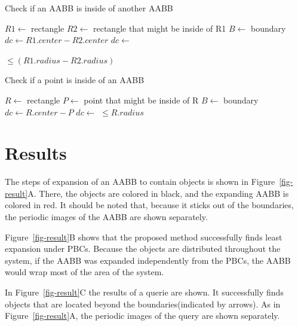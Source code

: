 \documentclass[10pt,letterpaper,twocolumn]{article}
\begin{document}
\begin{algorithm}[tb]
    \caption{Check if an AABB is inside of another AABB}
    \label{aabb_within_aabb}
    \begin{algorithmic}
        \State $R1 \gets$ rectangle
        \State $R2 \gets$ rectangle that might be inside of R1
        \State $B  \gets$ boundary
            \State $dc \gets R1.center - R2.center$
            \State $dc \gets$ 

            \State \Return {} $\leq (R1.radius - R2.radius)$
        \EndFunction
     \end{algorithmic}
\end{algorithm}

\begin{algorithm}[tb]
    \caption{Check if a point is inside of an AABB}
    \label{point_within_aabb}
    \begin{algorithmic}
        \State $R \gets$ rectangle
        \State $P \gets$ point that might be inside of R
        \State $B \gets$ boundary
            \State $dc \gets R.center - P$
            \State $dc \gets$ 
            \State \Return {} $\leq R.radius$
        \EndFunction
     \end{algorithmic}
\end{algorithm}

\section*{Results}

The steps of expansion of an AABB to contain objects is shown in
Figure~\ref{fig-result}A. There, the objects are colored in black,
and the expanding AABB is colored in red.
It should be noted that, because it sticks out of the boundaries,
the periodic images of the AABB are shown separately.

Figure~\ref{fig-result}B shows that the proposed method
successfully finds least expansion under PBCs.
Because the objects are distributed throughout the system,
if the AABB was expanded independently from the PBCs,
the AABB would wrap most of the area of the system.

In Figure~\ref{fig-result}C the results of a querie are shown.
It successfully finds objects that are located beyond the boundaries(indicated by arrows).
As in Figure~\ref{fig-result}A, the periodic images of the query are
shown separately.
\end{document}
